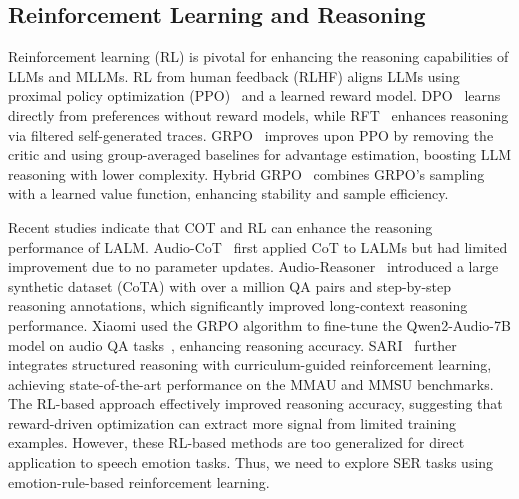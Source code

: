 \documentclass[11pt]{article}
\begin{document}
\subsection{Reinforcement Learning and Reasoning}
Reinforcement learning (RL) is pivotal for enhancing the reasoning capabilities of LLMs and MLLMs.
RL from human feedback (RLHF) aligns LLMs using proximal policy optimization (PPO)~\citep{schulman2017proximal} and a learned reward model.
DPO~\citep{rafailov2023direct} learns directly from preferences without reward models, while RFT~\citep{yuan2023scaling} enhances reasoning via filtered self-generated traces.
GRPO~\citep{shao2024deepseekmath} improves upon PPO by removing the critic and using group-averaged baselines for advantage estimation, boosting LLM reasoning with lower complexity.
Hybrid GRPO~\citep{sane2025hybrid} combines GRPO’s sampling with a learned value function, enhancing stability and sample efficiency.

Recent studies indicate that COT and RL can enhance the reasoning performance of LALM. Audio-CoT~\citep{ma2025audio} first applied CoT to LALMs but had limited improvement due to no parameter updates.
Audio-Reasoner~\citep{xie2025audio} introduced a large synthetic dataset (CoTA) with over a million QA pairs and step-by-step reasoning annotations, which significantly improved long-context reasoning performance.
Xiaomi used the GRPO algorithm to fine-tune the Qwen2-Audio-7B model on audio QA tasks~\citep{li2025reinforcement}, enhancing reasoning accuracy.
SARI~\citep{wen2025sari} further integrates structured reasoning with curriculum-guided reinforcement learning, achieving state-of-the-art performance on the MMAU and MMSU benchmarks.
The RL-based approach effectively improved reasoning accuracy, suggesting that reward-driven optimization can extract more signal from limited training examples. However, these RL-based methods are too generalized for direct application to speech emotion tasks. Thus, we need to explore SER tasks using emotion-rule-based reinforcement learning.
\end{document}
